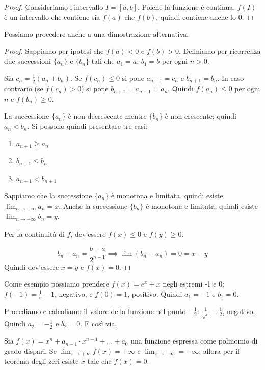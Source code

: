 \begin{proof}
Consideriamo l'intervallo $I = [a, b]$. Poiché la funzione è continua, $f(I)$ è un intervallo che contiene sia $f(a)$ che $f(b)$, quindi contiene anche lo 0.
\end{proof}

Possiamo procedere anche a una dimostrazione alternativa.

\begin{proof}
Sappiamo per ipotesi che $f(a) < 0$ e $f(b) > 0$. Definiamo per ricorrenza due successioni $\{a_n\}$ e $\{b_n\}$ tali che $a_1 = a$, $b_1 = b$ per ogni $n > 0$.

Sia $c_n = \frac{1}{2} (a_n + b_n)$. Se $f(c_n) \le 0$ si pone $a_{n+1} = c_n$ e $b_{n+1} = b_n$. In caso contrario (se $f(c_n) > 0$) si pone $b_{n+1} = a_{n+1} = a_n$. Quindi $f(a_n) \le 0$ per ogni $n$ e $f(b_n) \ge 0$.

La successione $\{a_n\}$ è non decrescente mentre $\{b_n\}$ è non crescente; quindi $a_n < b_n$. Si possono quindi presentare tre casi:
\begin{enumerate}
\item $a_{n+1} \ge a_n$
\item $b_{n+1} \le b_n$
\item $a_{n+1} < b_{n+1}$
\end{enumerate}
Sappiamo che la successione $\{a_n\}$ è monotona e limitata, quindi esiste $\lim_{n \to +\infty} a_n = x$. Anche la successione $\{b_n\}$ è monotona e limitata, quindi esiste $\lim_{n \to +\infty} b_n = y$.

Per la continuità di $f$, dev'essere $f(x) \le 0$ e $f(y) \ge 0$.

\begin{equation*}
b_n - a_n = \frac{b-a}{2^{n-1}} \implies \lim (b_n - a_n) = 0 = x - y
\end{equation*}
Quindi dev'essere $x = y$ e $f(x) = 0$.
\end{proof}

Come esempio possiamo prendere $f(x) = e^x + x$ negli estremi -1 e 0: $f(-1) = \frac{1}{e} - 1$, negativo, e $f(0)=1$, positivo. Quindi $a_1 = -1$ e $b_1 = 0$. 

Procediamo e calcoliamo il valore della funzione nel punto $-\frac{1}{2}$: $\frac{1}{\sqrt{e}} - \frac{1}{2}$, negativo. Quindi $a_2 = -\frac{1}{2}$ e $b_2 = 0$. E così via.

\begin{example}
Sia $f(x) = x^n + a_{n-1} \cdot x^{n-1} + \ldots + a_0$ una funzione espressa come polinomio di grado dispari. Se $\lim_{x \to +\infty} f(x) = +\infty$ e $\lim_{x \to -\infty} = -\infty$; allora per il teorema degli zeri esiste $x$ tale che $f(x) = 0$.
\end{example}

